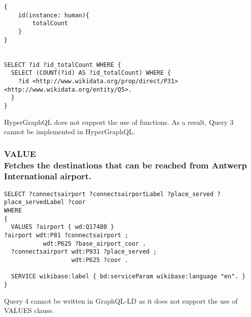 \begin{minipage}{\linewidth}
\begin{lstlisting}[label=listing:listing41, caption={Query 3 - GraphQL-LD}]
{
    id(instance: human){
        totalCount
    }
}


SELECT ?id ?id_totalCount WHERE { 
  SELECT (COUNT(?id) AS ?id_totalCount) WHERE { 
    ?id <http://www.wikidata.org/prop/direct/P31> <http://www.wikidata.org/entity/Q5>. 
  } 
}
\end{lstlisting}
\end{minipage}


HyperGraphQL does not support the use of functions. As a result, Query 3 cannot be implemented in HyperGraphQL.



\subsubsection{VALUE \\Fetches the destinations that can be reached from Antwerp International airport.}

\begin{minipage}{\linewidth}
\begin{lstlisting}[label=listing:listing43, caption={Query 4}]
SELECT ?connectsairport ?connectsairportLabel ?place_served ?place_servedLabel ?coor
WHERE
{
  VALUES ?airport { wd:Q17480 }  
?airport wdt:P81 ?connectsairport ;
           wdt:P625 ?base_airport_coor .
  ?connectsairport wdt:P931 ?place_served ;
                   wdt:P625 ?coor .

  SERVICE wikibase:label { bd:serviceParam wikibase:language "en". }
}
\end{lstlisting}
\end{minipage}

Query 4 cannot be written in GraphQL-LD as it does not support the use of VALUES clause.

